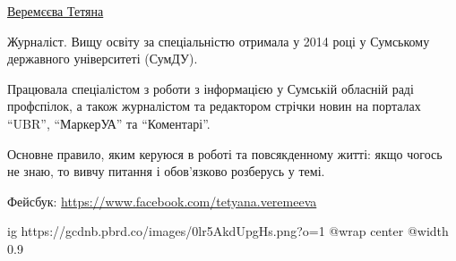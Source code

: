  
 
 
 
 


\href{https://donbas24.news/author/tetyana-veremjejeva}{Веремєєва Тетяна}

Журналіст. Вищу освіту за спеціальністю отримала у 2014 році у Сумському
державного університеті (СумДУ).

Працювала спеціалістом з роботи з інформацією у Сумській обласній раді
профспілок, а також журналістом та редактором стрічки новин на порталах \enquote{UBR},
\enquote{МаркерУА} та \enquote{Коментарі}.

Основне правило, яким керуюся в роботі та повсякденному житті: якщо чогось не
знаю, то вивчу питання і обов'язково розберусь у темі.

Фейсбук: \url{https://www.facebook.com/tetyana.veremeeva}\par

\ifcmt
  ig https://gcdnb.pbrd.co/images/0lr5AkdUpgHs.png?o=1
  @wrap center
  @width 0.9
\fi
